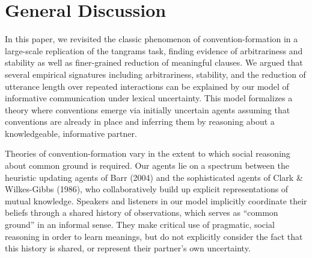 \documentclass[alpha-refs]{wiley-article}
\begin{document}
%
%
\section{General Discussion}\label{general-discussion}

In this paper, we revisited the classic phenomenon of
convention-formation in a large-scale replication of the tangrams task,
finding evidence of arbitrariness and stability as well as finer-grained
reduction of meaningful clauses. We argued that several empirical
signatures including arbitrariness, stability, and the reduction of
utterance length over repeated interactions can be explained by our
model of informative communication under lexical uncertainty. This model
formalizes a theory where conventions emerge via initially uncertain
agents assuming that conventions are already in place and inferring them
by reasoning about a knowledgeable, informative partner.

Theories of convention-formation vary in the extent to which social
reasoning about common ground is required. Our agents lie on a spectrum
between the heuristic updating agents of Barr (2004) and the
sophisticated agents of Clark \& Wilkes-Gibbs (1986), who
collaboratively build up explicit representations of mutual knowledge.
Speakers and listeners in our model implicitly coordinate their beliefs
through a shared history of observations, which serves as ``common
ground'' in an informal sense. They make critical use of pragmatic,
social reasoning in order to learn meanings, but do not explicitly
consider the fact that this history is shared, or represent their
partner's own uncertainty.
\end{document}
